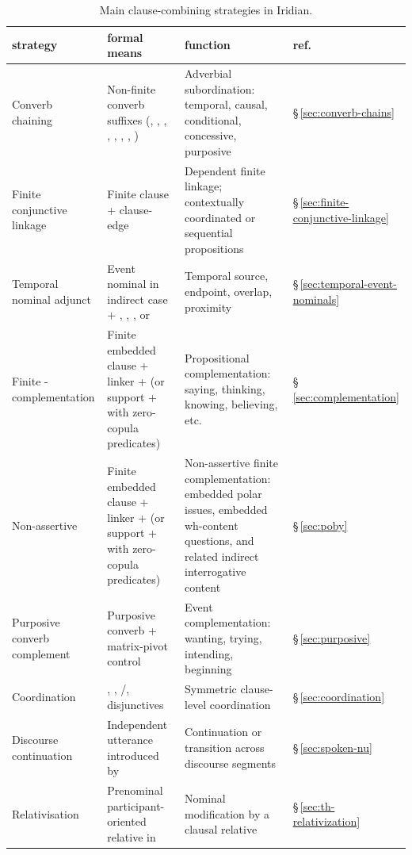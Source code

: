 \begin{table}[ht]
	\footnotesize
	\caption{Main clause-combining strategies in Iridian.}\label{tab:th-combining-strategies}
	\begin{tabularx}{\textwidth}{L L L l}
		\toprule
		{\sc strategy} & {\sc formal means} & {\sc function} & {\sc ref.} \\
		\midrule
		Converb chaining &
		Non-finite converb suffixes (, , ,
		, , , , ) &
		Adverbial subordination: temporal, causal, conditional,
		concessive, purposive &
		§\,\ref{sec:converb-chains} \\[4pt]
        Finite conjunctive linkage &
        Finite clause + clause-edge  &
        Dependent finite linkage; contextually coordinated or sequential propositions &
        §\,\ref{sec:finite-conjunctive-linkage} \\[4pt]
        Temporal nominal adjunct &
        Event nominal in indirect case + , , , or  &
        Temporal source, endpoint, overlap, proximity &
        §\,\ref{sec:temporal-event-nominals} \\[4pt]
		Finite -complementation &
		Finite embedded clause + linker  +  (or
		support  +  with zero-copula predicates) &
		Propositional complementation: saying, thinking, knowing,
		believing, etc. &
		§\,\ref{sec:complementation} \\[4pt]
		Non-assertive  &
		Finite embedded clause + linker  +  (or
		support  +  with zero-copula predicates) &
		Non-assertive finite complementation: embedded polar issues,
		embedded wh-content questions, and related indirect
		interrogative content &
		§\,\ref{sec:poby} \\[4pt]
		Purposive converb complement &
		Purposive converb + matrix-pivot control &
		Event complementation: wanting, trying, intending, beginning &
		§\,\ref{sec:purposive} \\[4pt]
		Coordination &
		, , /, disjunctives &
		Symmetric clause-level coordination &
		§\,\ref{sec:coordination} \\[4pt]
        Discourse continuation &
        Independent utterance introduced by  &
        Continuation or transition across discourse segments &
        §\,\ref{sec:spoken-nu} \\[4pt]
		Relativisation &
		Prenominal participant-oriented relative in  &
		Nominal modification by a clausal relative &
		§\,\ref{sec:th-relativization} \\
		\bottomrule
	\end{tabularx}
\end{table}

